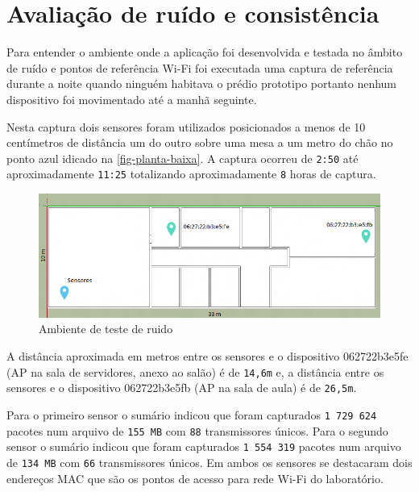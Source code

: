 \section{Avaliação de ruído e consistência}
\label{sec:teste-ruido}

Para entender o ambiente onde a aplicação foi desenvolvida e testada no âmbito
de ruído e pontos de referência Wi-Fi foi executada uma captura de referência
durante a noite quando ninguém habitava o prédio prototipo portanto nenhum
dispositivo foi movimentado até a manhã seguinte.

Nesta captura dois sensores foram utilizados posicionados a menos de 10
centímetros de distância um do outro sobre uma mesa a um metro do chão no ponto
azul idicado na \autoref{fig-planta-baixa}. A captura
ocorreu de \texttt{2:50} até aproximadamente \texttt{11:25} totalizando
aproximadamente \texttt{8} horas de captura.

\begin{figure}[htb]
	\caption{\label{fig-planta-baixa}Ambiente de teste de ruido}
	\begin{center}
		\includegraphics[width=1\textwidth]{060-testes/data-analisis/planta-baixa-ruido.png}
	\end{center}
\end{figure}

A distância aproximada em metros entre os sensores e o dispositivo
062722b3e5fe (AP na sala de servidores, anexo ao salão) é de
\texttt{14,6m} e, a distância  entre os sensores e o dispositivo
062722b3e5fb (AP na sala de aula) é de \texttt{26,5m}.

Para o primeiro sensor o sumário indicou que foram capturados \texttt{1 729 624}
pacotes num arquivo de \texttt{155 MB} com \texttt{88} transmissores únicos.
Para o segundo sensor o sumário indicou que foram capturados \texttt{1 554 319}
pacotes num arquivo de \texttt{134 MB} com \texttt{66} transmissores únicos.
Em ambos os sensores se destacaram dois endereços MAC que são os pontos de
acesso para rede Wi-Fi do laboratório.

